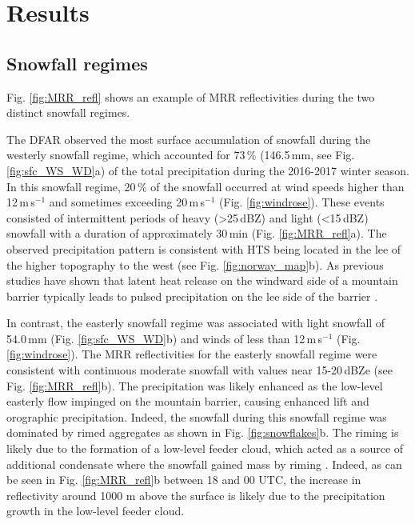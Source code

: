 \documentclass{ametsocV5}
\begin{document}
\section{Results}\label{sec:res}
    \subsection{Snowfall regimes}\label{sec:res:snowfall_regimes}
        Fig. \ref{fig:MRR_refl} shows an example of MRR reflectivities during the two distinct snowfall regimes. 

        The DFAR observed the most surface accumulation of snowfall during the westerly snowfall regime, which accounted for 73\,\% (146.5\,mm, see Fig. \ref{fig:sfc_WS_WD}a) of the total precipitation during the 2016-2017 winter season. In this snowfall regime, 20\,\% of the snowfall occurred at wind speeds higher than 12\,m\,s$^{-1}$ and sometimes exceeding 20\,m\,s$^{-1}$ (Fig. \ref{fig:windrose}). These events consisted of intermittent periods of heavy (\textgreater 25\,dBZ) and light (\textless 15\,dBZ) snowfall with a duration of approximately 30\,min (Fig. \ref{fig:MRR_refl}a). The observed precipitation pattern is consistent with HTS being located in the lee of the higher topography to the west (see Fig. \ref{fig:norway_map}b). As previous studies have shown that latent heat release on the windward side of a mountain barrier typically leads to pulsed precipitation on the lee side of the barrier \citep{sinclair_factors_1997,kaplan_role_2009}. 
            
        In contrast, the easterly snowfall regime was associated with light snowfall of 54.0\,mm (Fig. \ref{fig:sfc_WS_WD}b) and  winds of less than  12\,m\,s$^{-1}$ (Fig. \ref{fig:windrose}). The MRR reflectivities for the easterly snowfall regime were consistent with continuous moderate snowfall with values near 15-20\,dBZe (see Fig. \ref{fig:MRR_refl}b). The precipitation was likely enhanced as the low-level easterly flow impinged on the mountain barrier, causing enhanced lift and orographic precipitation. Indeed, the snowfall during this snowfall regime was dominated by rimed aggregates as shown in Fig. \ref{fig:snowflakes}b. The riming is likely due to the formation of a low-level feeder cloud, which acted as a source of additional condensate where the snowfall gained mass by riming \citep{borys_mountaintop_2003,lowenthal_isotopic_2016}. Indeed, as can be seen in Fig. \ref{fig:MRR_refl}b between 18 and 00 UTC, the increase in reflectivity around 1000 m above the surface is likely due to the precipitation growth in the low-level feeder cloud.
\end{document}
